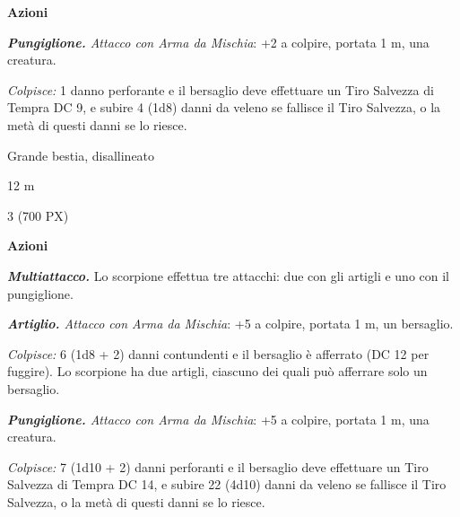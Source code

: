 \begin{multicols}{2}
{\textbf{Azioni}

\emph{\textbf{Pungiglione.} Attacco con Arma da Mischia}: +2 a colpire, portata 1 m, una creatura.

\emph{Colpisce:} 1 danno perforante e il bersaglio deve effettuare un Tiro Salvezza di Tempra DC 9, e subire 4 (1d8) danni da veleno se fallisce il Tiro Salvezza, o la metà di questi danni se lo riesce.

\begin{description}[noitemsep, topsep=0pt, parsep=0pt, partopsep=0pt, itemsep=1pt, leftmargin=2.35cm,  labelwidth=2.2cm, itemindent=0cm, listparindent=0pt] %
\setlength{\baselineskip}{10pt}
\item[\textbf{Taglia/Tipo}] Grande bestia, disallineato
\item[\textbf{Caratt.}] 
\item[\textbf{Punti Ferita}] 
\item[\textbf{Tiri Salvez.}] 
\item[\textbf{Movimento}] 12 m
\item[\textbf{Sfida}] 3 (700 PX)
\end{description}
\smallskip

\textbf{Azioni}

\emph{\textbf{Multiattacco.}} Lo scorpione effettua tre attacchi: due con gli artigli e uno con il pungiglione.

\emph{\textbf{Artiglio.} Attacco con Arma da Mischia}: +5 a colpire, portata 1 m, un bersaglio.

\emph{Colpisce:} 6 (1d8 + 2) danni contundenti e il bersaglio è afferrato (DC 12 per fuggire). Lo scorpione ha due artigli, ciascuno dei quali può afferrare solo un bersaglio.

\emph{\textbf{Pungiglione.} Attacco con Arma da Mischia}: +5 a colpire, portata 1 m, una creatura.

\emph{Colpisce:} 7 (1d10 + 2) danni perforanti e il bersaglio deve effettuare un Tiro Salvezza di Tempra DC 14, e subire 22 (4d10) danni da veleno se fallisce il Tiro Salvezza, o la metà di questi danni se lo riesce.

}
\end{multicols}
